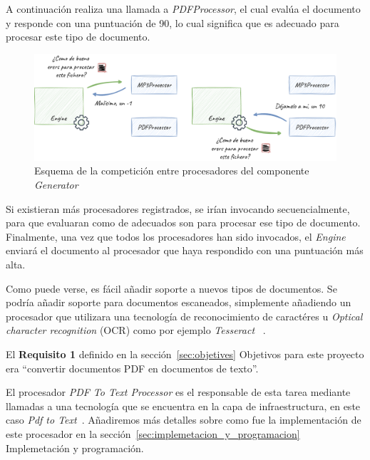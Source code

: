 A continuación realiza una llamada a \textit{PDFProcessor}, el cual evalúa el documento y responde con una puntuación
de 90, lo cual significa que es adecuado para procesar este tipo de documento.

\begin{figure}[ht]
    \begin{center}
        \includegraphics[width=\textwidth]{./chapter/4/images/chapter_4.1.generator_component_processors}
        \caption{Esquema de la competición entre procesadores del componente \textit{Generator}}
        \label{fig:chapter_4.1.generator_component_processors}
    \end{center}
\end{figure}

Si existieran más procesadores registrados, se irían invocando secuencialmente, para que evaluaran como de adecuados
son para procesar ese tipo de documento.
Finalmente, una vez que todos los procesadores han sido invocados, el \textit{Engine} enviará el documento al procesador
que haya respondido con una puntuación más alta.

Como puede verse, es fácil añadir soporte a nuevos tipos de documentos.
Se podría añadir soporte para documentos escaneados, simplemente añadiendo un procesador que utilizara una tecnología
de reconocimiento de caractéres u \textit{Optical character recognition} (OCR) como por ejemplo \textit{Tesseract}
~\cite{url_tesseract}.

El \textbf{Requisito 1} definido en la sección~\ref{sec:objetives} Objetivos para este proyecto era
``convertir documentos PDF en documentos de texto''.

El procesador \textit{PDF To Text Processor} es el responsable de esta tarea mediante llamadas a una tecnología que se
encuentra en la capa de infraestructura, en este caso
\textit{Pdf to Text}~\cite{url_pdftotextl}.
Añadiremos más detalles sobre como fue la implementación de este procesador en la
sección~\ref{sec:implemetacion_y_programacion} Implemetación y programación.


